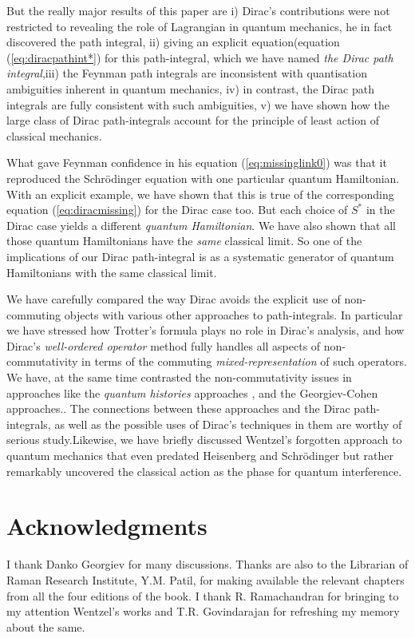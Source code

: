 \documentclass[12pt]{article}
\begin{document}
But the really major results of this paper are i) Dirac's contributions were not restricted to revealing the role of Lagrangian in
quantum mechanics, he in fact discovered the path integral, ii) giving an explicit equation(equation (\ref{eq:diracpathint*}) for this 
path-integral, which we have named \emph{the Dirac path integral},iii) the Feynman path integrals are inconsistent with quantisation ambiguities
inherent in quantum mechanics, iv) in contrast, the Dirac path integrals are fully consistent with such ambiguities, v) we have shown
how the large class of Dirac path-integrals account for the principle of least action of classical mechanics.

What gave Feynman confidence in his equation (\ref{eq:missinglink0}) was that it reproduced the Schr\"odinger equation with one particular quantum
Hamiltonian. With an explicit example, we
have shown that this is true of the corresponding equation (\ref{eq:diracmissing}) for the Dirac case too. But each choice of $S^*$ in the
Dirac case yields a different \emph{quantum Hamiltonian}. We have also shown that all those quantum Hamiltonians have the \emph{same}
classical limit. So one of the implications of our Dirac path-integral is as a systematic generator of quantum Hamiltonians with the
same classical limit.

We have carefully compared the way Dirac avoids the explicit use of non-commuting objects with various other approaches to path-integrals.
In particular we have stressed how Trotter's formula plays no role in Dirac's analysis, and how Dirac's \emph{well-ordered operator} method
fully handles all aspects of non-commutativity in terms of the commuting \emph{mixed-representation} of such operators. We have, at the same 
time contrasted the non-commutativity issues in approaches like the \emph{quantum histories} approaches \cite{griffiths}, and the 
Georgiev-Cohen \cite{histories} approaches.. The connections between these
approaches and the Dirac path-integrals, as well as the possible uses of Dirac's techniques in them are worthy of serious study.Likewise, we
have briefly discussed Wentzel's forgotten approach to quantum mechanics that even predated Heisenberg and Schr\"odinger but rather
remarkably uncovered the classical action as the phase for quantum interference.

\section{Acknowledgments}
I thank Danko Georgiev for many discussions.
Thanks are also to the Librarian of Raman Research Institute, Y.M. Patil, for making available the relevant
chapters from all the four editions of the book. I thank R. Ramachandran for bringing to my attention Wentzel's works and 
T.R. Govindarajan for refreshing my memory about the same. 
\end{document}
